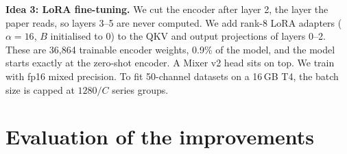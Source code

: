 \documentclass[conference]{IEEEtran}
\begin{document}
\textbf{Idea 3: LoRA fine-tuning.} We cut the encoder after layer 2, the layer the paper reads, so layers 3--5 are
never computed. We add rank-8 LoRA adapters \cite{lora} ($\alpha=16$, $B$ initialised to 0) to the QKV and output
projections of layers 0--2. These are 36,864 trainable encoder weights, 0.9\% of the model, and the model starts
exactly at the zero-shot encoder. A Mixer v2 head sits on top. We train with fp16 mixed precision. To fit 50-channel
datasets on a 16\,GB T4, the batch size is capped at $1280/C$ series groups.

\section{Evaluation of the improvements}\label{sec:results}
\end{document}
